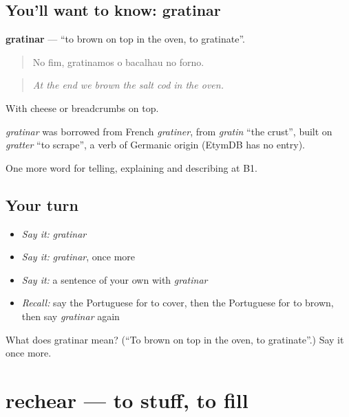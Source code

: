 \subsection*{You'll want to know: gratinar}
\textbf{gratinar} — \textquotedblleft{}to brown on top in the oven, to gratinate\textquotedblright{}.

\begin{quote}
No fim, gratinamos o bacalhau no forno.
\end{quote}

\begin{quote}
\emph{At the end we brown the salt cod in the oven.}
\end{quote}

With cheese or breadcrumbs on top.

\begin{cousinweb}
\emph{gratinar} was borrowed from French \emph{gratiner}, from \emph{gratin} \textquotedblleft{}the crust\textquotedblright{}, built on \emph{gratter} \textquotedblleft{}to scrape\textquotedblright{}, a verb of Germanic origin (EtymDB has no entry).
\end{cousinweb}

\begin{grammarlens}[title={What you've built}]
One more word for telling, explaining and describing at B1.
\end{grammarlens}

\subsection*{Your turn}
\begin{itemize}
\raggedright
  \item \emph{Say it:} \emph{gratinar}
  \item \emph{Say it:} \emph{gratinar}, once more
  \item \emph{Say it:} a sentence of your own with \emph{gratinar}
  \item \emph{Recall:} say the Portuguese for to cover, then the Portuguese for to brown, then say \emph{gratinar} again
\end{itemize}

\begin{tcolorbox}[breakable,colback=teal!4,colframe=teal!35!black,title={Before you move on}]
What does gratinar mean? (\textquotedblleft{}To brown on top in the oven, to gratinate\textquotedblright{}.) Say it once more.
\end{tcolorbox}
\section[rechear]{rechear — to stuff, to fill}


